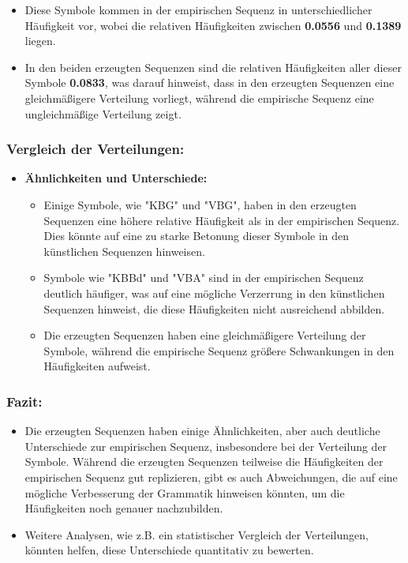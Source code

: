 \documentclass[
]{article}
\begin{document}
\begin{enumerate}
  \begin{itemize}
  \item
    Diese Symbole kommen in der empirischen Sequenz in unterschiedlicher
    Häufigkeit vor, wobei die relativen Häufigkeiten zwischen
    \textbf{0.0556} und \textbf{0.1389} liegen.
  \item
    In den beiden erzeugten Sequenzen sind die relativen Häufigkeiten
    aller dieser Symbole \textbf{0.0833}, was darauf hinweist, dass in
    den erzeugten Sequenzen eine gleichmäßigere Verteilung vorliegt,
    während die empirische Sequenz eine ungleichmäßige Verteilung zeigt.
  \end{itemize}
\end{enumerate}

\subsubsection{\texorpdfstring{\textbf{Vergleich der
Verteilungen:}}{Vergleich der Verteilungen:}}\label{vergleich-der-verteilungen}

\begin{itemize}
\item
  \textbf{Ähnlichkeiten und Unterschiede:}

  \begin{itemize}
  \item
    Einige Symbole, wie "KBG" und "VBG", haben in den erzeugten
    Sequenzen eine höhere relative Häufigkeit als in der empirischen
    Sequenz. Dies könnte auf eine zu starke Betonung dieser Symbole in
    den künstlichen Sequenzen hinweisen.
  \item
    Symbole wie "KBBd" und "VBA" sind in der empirischen Sequenz
    deutlich häufiger, was auf eine mögliche Verzerrung in den
    künstlichen Sequenzen hinweist, die diese Häufigkeiten nicht
    ausreichend abbilden.
  \item
    Die erzeugten Sequenzen haben eine gleichmäßigere Verteilung der
    Symbole, während die empirische Sequenz größere Schwankungen in den
    Häufigkeiten aufweist.
  \end{itemize}
\end{itemize}

\subsubsection{\texorpdfstring{\textbf{Fazit:}}{Fazit:}}\label{fazit}

\begin{itemize}
\item
  Die erzeugten Sequenzen haben einige Ähnlichkeiten, aber auch
  deutliche Unterschiede zur empirischen Sequenz, insbesondere bei der
  Verteilung der Symbole. Während die erzeugten Sequenzen teilweise die
  Häufigkeiten der empirischen Sequenz gut replizieren, gibt es auch
  Abweichungen, die auf eine mögliche Verbesserung der Grammatik
  hinweisen könnten, um die Häufigkeiten noch genauer nachzubilden.
\item
  Weitere Analysen, wie z.B. ein statistischer Vergleich der
  Verteilungen, könnten helfen, diese Unterschiede quantitativ zu
  bewerten.
\end{itemize}
\end{document}
